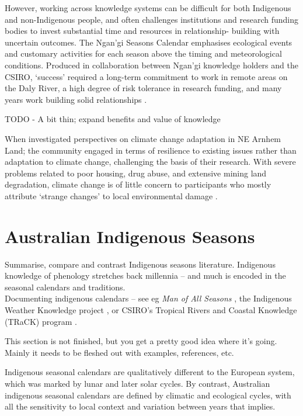 However, working across knowledge systems can be difficult for both Indigenous 
and non-Indigenous people, and often challenges institutions and research 
funding bodies to invest substantial time and resources in relationship-
building with uncertain outcomes.  The Ngan'gi Seasons Calendar emphasises 
ecological events and customary activities for each season above the timing and 
meteorological conditions.  Produced in collaboration between Ngan'gi knowledge 
holders and the CSIRO, `success' required a long-term commitment to work in 
remote areas on the Daly River, a high degree of risk tolerance in 
research funding, and many years work building solid relationships \citep{woodward2010}.

TODO - A bit thin; expand benefits and value of knowledge

When \citet{petheram2010} investigated perspectives on climate change 
adaptation in NE Arnhem Land; the community engaged in terms of resilience to 
existing issues rather than adaptation to climate change, challenging the basis 
of their research.  With severe problems related to poor housing, drug abuse, 
and extensive mining land degradation, climate change is of little concern to 
participants who mostly attribute `strange changes' to local environmental 
damage \citep{green2010a}.




\section{Australian Indigenous Seasons}

Summarise, compare and contrast Indigenous seasons literature.
Indigenous knowledge of phenology stretches back millennia – and much is 
encoded in the seasonal calendars and traditions.\\


Documenting indigenous calendars – see eg \textit{Man of All Seasons} \citep{davis1989},
the Indigenous Weather Knowledge project \citet{BOM-iwk},
or CSIRO’s Tropical Rivers and Coastal Knowledge (TRaCK) program \citep{CSIROcals,oconnor2010}.


This section is not finished, but you get a pretty good idea where it's 
going.  Mainly it needs to be fleshed out with examples, references, etc. 

Indigenous seasonal calendars are qualitatively different to the European 
system, which was marked by lunar and later solar cycles.  By contrast, 
Australian indigenous seasonal calendars are defined by climatic and ecological 
cycles, with all the sensitivity to local context and variation between years 
that implies.


